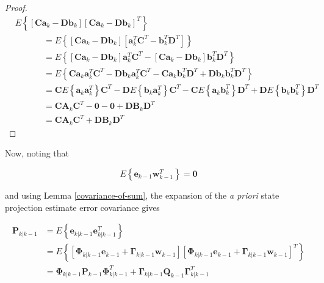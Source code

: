 \documentclass[12pt]{article}
\begin{document}
\begin{proof}
\begin{equation*}
    \begin{aligned}
        &E \left\{ \left[ \mathbf{C} \mathbf{a}_k - \mathbf{D} \mathbf{b}_k \right] \left[ \mathbf{C} \mathbf{a}_k - \mathbf{D} \mathbf{b}_k \right]^T \right\} \\
        & \phantom{XXXX} = E \left\{ \left[ \mathbf{C} \mathbf{a}_k - \mathbf{D} \mathbf{b}_k \right] \left[ \mathbf{a}_k^T \mathbf{C}^T - \mathbf{b}_k^T \mathbf{D}^T \right] \right\} \\
        & \phantom{XXXX} = E \left\{ \left[ \mathbf{C} \mathbf{a}_k - \mathbf{D} \mathbf{b}_k \right] \mathbf{a}_k^T \mathbf{C}^T
        - \left[ \mathbf{C} \mathbf{a}_k - \mathbf{D} \mathbf{b}_k \right] \mathbf{b}_k^T \mathbf{D}^T \right\} \\
        & \phantom{XXXX} = E \left\{ \mathbf{C} \mathbf{a}_k \mathbf{a}_k^T \mathbf{C}^T - \mathbf{D} \mathbf{b}_k \mathbf{a}_k^T \mathbf{C}^T
        - \mathbf{C} \mathbf{a}_k \mathbf{b}_k^T \mathbf{D}^T + \mathbf{D} \mathbf{b}_k \mathbf{b}_k^T \mathbf{D}^T \right\} \\
        & \phantom{XXXX} = \mathbf{C} E \left\{ \mathbf{a}_k \mathbf{a}_k^T \right\} \mathbf{C}^T - \mathbf{D} E \left\{ \mathbf{b}_k \mathbf{a}_k^T \right\} \mathbf{C}^T
        - \mathbf{C} E \left\{ \mathbf{a}_k \mathbf{b}_k^T \right\} \mathbf{D}^T + \mathbf{D} E \left\{ \mathbf{b}_k \mathbf{b}_k^T \right\} \mathbf{D}^T \\
        & \phantom{XXXX} = \mathbf{C} \mathbf{A}_k \mathbf{C}^T - \mathbf{0} - \mathbf{0} + \mathbf{D} \mathbf{B}_k \mathbf{D}^T \\
        & \phantom{XXXX} = \mathbf{C} \mathbf{A}_k \mathbf{C}^T + \mathbf{D} \mathbf{B}_k \mathbf{D}^T
    \end{aligned}
\end{equation*}
\end{proof}

Now, noting that

\begin{equation*}
    E \left\{ \mathbf{e}_{k-1} \mathbf{w}_{k-1}^T \right\} = \mathbf{0}
\end{equation*}

and using Lemma \ref{covariance-of-sum}, the expansion of the \textit{a priori} state
projection estimate error covariance gives

\begin{equation*}
    \begin{aligned}
        \mathbf{P}_{k|k-1} &= E \left\{ \mathbf{e}_{k|k-1} \mathbf{e}_{k|k-1}^T \right\} \\
        &= E \left\{ \left[ \mathbf{\Phi}_{k|k-1} \mathbf{e}_{k-1} + \mathbf{\Gamma}_{k|k-1} \mathbf{w}_{k-1} \right]
        \left[ \mathbf{\Phi}_{k|k-1} \mathbf{e}_{k-1} + \mathbf{\Gamma}_{k|k-1} \mathbf{w}_{k-1} \right]^T \right\} \\
        &= \mathbf{\Phi}_{k|k-1} \mathbf{P}_{k-1} \mathbf{\Phi}_{k|k-1}^T + \mathbf{\Gamma}_{k|k-1} \mathbf{Q}_{k-1} \mathbf{\Gamma}_{k|k-1}^T
    \end{aligned}
\end{equation*}
\end{document}
